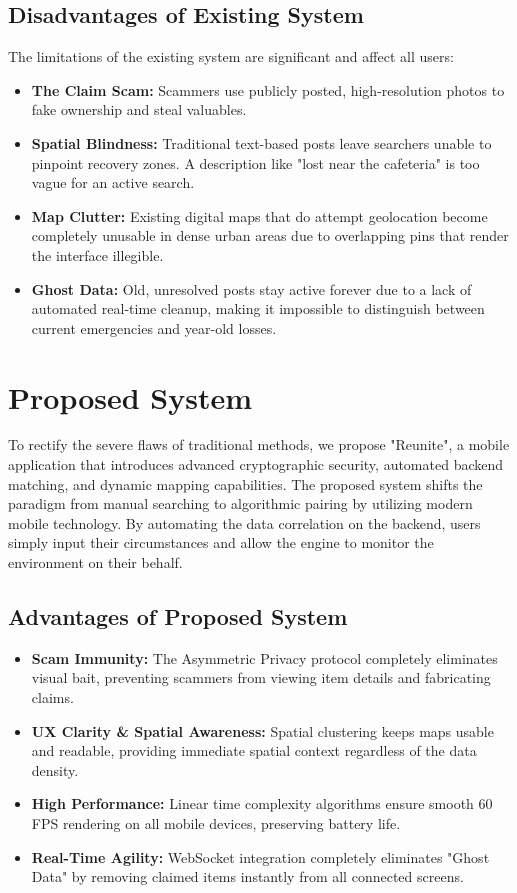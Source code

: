 \documentclass[12pt,a4paper]{report}
\begin{document}
\subsection{Disadvantages of Existing System}
The limitations of the existing system are significant and affect all users:
\begin{itemize}
    \item \textbf{The Claim Scam:} Scammers use publicly posted, high-resolution photos to fake ownership and steal valuables.
    \item \textbf{Spatial Blindness:} Traditional text-based posts leave searchers unable to pinpoint recovery zones. A description like "lost near the cafeteria" is too vague for an active search.
    \item \textbf{Map Clutter:} Existing digital maps that do attempt geolocation become completely unusable in dense urban areas due to overlapping pins that render the interface illegible.
    \item \textbf{Ghost Data:} Old, unresolved posts stay active forever due to a lack of automated real-time cleanup, making it impossible to distinguish between current emergencies and year-old losses.
\end{itemize}

\section{Proposed System}
To rectify the severe flaws of traditional methods, we propose "Reunite", a mobile application that introduces advanced cryptographic security, automated backend matching, and dynamic mapping capabilities. The proposed system shifts the paradigm from manual searching to algorithmic pairing by utilizing modern mobile technology. By automating the data correlation on the backend, users simply input their circumstances and allow the engine to monitor the environment on their behalf.

\subsection{Advantages of Proposed System}
\begin{itemize}
\item \textbf{Scam Immunity:} The Asymmetric Privacy protocol completely eliminates visual bait, preventing scammers from viewing item details and fabricating claims.
\item \textbf{UX Clarity \& Spatial Awareness:} Spatial clustering keeps maps usable and readable, providing immediate spatial context regardless of the data density.
\item \textbf{High Performance:} Linear time complexity algorithms ensure smooth 60 FPS rendering on all mobile devices, preserving battery life.
\item \textbf{Real-Time Agility:} WebSocket integration completely eliminates "Ghost Data" by removing claimed items instantly from all connected screens.
\end{itemize}
\end{document}
